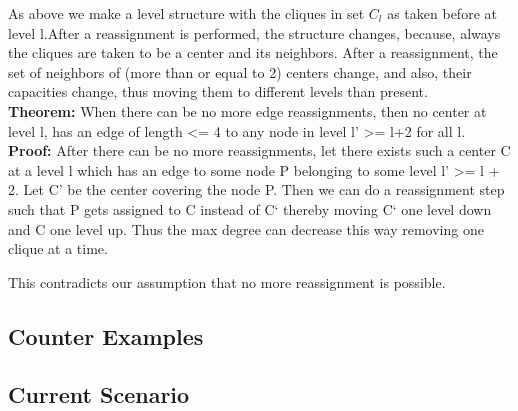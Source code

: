 \documentclass[12pt,a4paper,onecolumn]{article}
\begin{document}
\begin{itemize}
\begin{figure}
\end{figure}
As above we make a level structure with the cliques in set $C_l$ as taken before at level l.After a reassignment is performed, the structure changes, because, always the cliques are taken to be a center and its neighbors. After a reassignment, the set of neighbors of (more than or equal to 2) centers change, and also, their capacities change, thus moving them to different levels than present. \\\textbf{Theorem:}
When there can be no more edge reassignments, then no center at level l, has an edge of length <= 4 to any node in level l’ >= l+2 for all l. 
\\
\textbf{Proof:}
After there can be no more reassignments, let there exists such a center C at a level l which has an edge to some node P belonging to some level l’ >= l + 2. Let C’ be the center covering the node P. Then we can do a reassignment step such that P gets assigned to C instead of C` thereby moving C` one level down and C one level up. Thus the max degree can decrease this way removing one clique at a time. 


\begin{figure}

\end{figure}

This contradicts our assumption that no more reassignment is possible.

\end{itemize}
\subsection{Counter Examples}
\subsection{Current Scenario}
\end{document}
